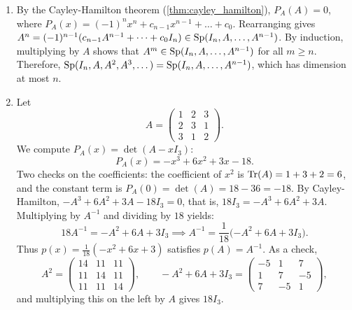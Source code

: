 \begin{exercisesolution}
\label{sol:subspace_matrix_powers_and_inverse}
\begin{enumerate}[label=\textbf{(\alph*)}]
    \item By the Cayley-Hamilton theorem (\cref{thm:cayley_hamilton}), $P_A(A) = 0$, where $P_A(x) = (-1)^n x^n + c_{n-1} x^{n-1} + \dots + c_0$.
    Rearranging gives $A^n = (-1)^{n-1}(c_{n-1} A^{n-1} + \dots + c_0 I_n) \in \operatorname{Sp}(I_n, A, \dots, A^{n-1})$.
    By induction, multiplying by $A$ shows that $A^m \in \operatorname{Sp}(I_n, A, \dots, A^{n-1})$ for all $m \ge n$.
    Therefore, $\operatorname{Sp}(I_n, A, A^2, A^3, \dots) = \operatorname{Sp}(I_n, A, \dots, A^{n-1})$, which has dimension at most $n$.

    \item Let
    \[
    A = \begin{pmatrix} 1 & 2 & 3 \\ 2 & 3 & 1 \\ 3 & 1 & 2 \end{pmatrix}.
    \]
    We compute $P_A(x) = \det(A - x I_3)$:
    \[
    P_A(x) = -x^3 + 6x^2 + 3x - 18.
    \]
    Two checks on the coefficients: the coefficient of $x^2$ is $\operatorname{Tr}(A) = 1 + 3 + 2 = 6$, and the constant term is $P_A(0) = \det(A) = 18 - 36 = -18$.
    By Cayley-Hamilton, $-A^3 + 6A^2 + 3A - 18 I_3 = 0$, that is, $18 I_3 = -A^3 + 6A^2 + 3A$.
    Multiplying by $A^{-1}$ and dividing by $18$ yields:
    \[
    18 A^{-1} = -A^2 + 6A + 3I_3 \implies A^{-1} = \frac{1}{18}\big({-A^2} + 6A + 3I_3\big).
    \]
    Thus $p(x) = \frac{1}{18}(-x^2 + 6x + 3)$ satisfies $p(A) = A^{-1}$. As a check,
    \[
    A^2 = \begin{pmatrix} 14 & 11 & 11 \\ 11 & 14 & 11 \\ 11 & 11 & 14 \end{pmatrix}, \qquad
    -A^2 + 6A + 3I_3 = \begin{pmatrix} -5 & 1 & 7 \\ 1 & 7 & -5 \\ 7 & -5 & 1 \end{pmatrix},
    \]
    and multiplying this on the left by $A$ gives $18 I_3$. \qedhere
\end{enumerate}
\end{exercisesolution}

